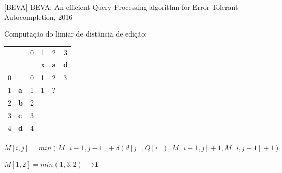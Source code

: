 \documentclass[11pt]{beamer}
\begin{document}
\begin{frame}{[BEVA] BEVA: An efficient Query Processing algorithm for Error-Tolerant Autocompletion, 2016}

    Computação do limiar de distância de edição:
  
    \begin{table}[]
    \begin{tabular}{llllll}
     &  & \multicolumn{1}{c}{{\color[HTML]{656565} 0}} & \multicolumn{1}{c}{{\color[HTML]{656565} 1}} & \multicolumn{1}{c}{{\color[HTML]{656565} 2}} & \multicolumn{1}{c}{{\color[HTML]{656565} 3}} \\
     &  &  & \textbf{x} & \textbf{a} & \textbf{d} \\ \cline{3-6} 
    {\color[HTML]{656565} 0} & \multicolumn{1}{l|}{} & \multicolumn{1}{l|}{{\color[HTML]{000000} 0}} & \multicolumn{1}{l|}{{\color[HTML]{000000} 1}} & \multicolumn{1}{l|}{{\color[HTML]{000000} 2}} & \multicolumn{1}{l|}{{\color[HTML]{000000} 3}} \\ \cline{3-6} 
    {\color[HTML]{656565} 1} & \multicolumn{1}{l|}{\textbf{a}} & \multicolumn{1}{l|}{{\color[HTML]{000000} 1}} & \multicolumn{1}{l|}{{\color[HTML]{000000} 1}} & \multicolumn{1}{l|}{{\color[HTML]{000000} ?}} & \multicolumn{1}{l|}{{\color[HTML]{000000} }} \\ \cline{3-6} 
    {\color[HTML]{656565} 2} & \multicolumn{1}{l|}{\textbf{b}} & \multicolumn{1}{c|}{{\color[HTML]{000000} 2}} & \multicolumn{1}{c|}{{\color[HTML]{000000} }} & \multicolumn{1}{c|}{{\color[HTML]{000000} }} & \multicolumn{1}{c|}{{\color[HTML]{000000} }} \\ \cline{3-6} 
    {\color[HTML]{656565} 3} & \multicolumn{1}{l|}{\textbf{c}} & \multicolumn{1}{l|}{{\color[HTML]{000000} 3}} & \multicolumn{1}{l|}{{\color[HTML]{000000} }} & \multicolumn{1}{l|}{{\color[HTML]{000000} }} & \multicolumn{1}{l|}{{\color[HTML]{000000} }} \\ \cline{3-6} 
    {\color[HTML]{656565} 4} & \multicolumn{1}{l|}{\textbf{d}} & \multicolumn{1}{c|}{{\color[HTML]{000000} 4}} & \multicolumn{1}{c|}{{\color[HTML]{000000} }} & \multicolumn{1}{c|}{{\color[HTML]{000000} }} & \multicolumn{1}{c|}{{\color[HTML]{000000} }} \\ \cline{3-6} 
    \end{tabular}
    \end{table}
    
    \small
    $M[i, j] = min(M[i - 1, j - 1] + \delta(d[j], Q[i]), M[i - 1, j] + 1, M[i, j - 1] + 1)$ \pause
    
    $M[1, 2] = min(1, 3, 2)$ \pause $\to \textbf{1}$
    
\end{frame}
\end{document}
